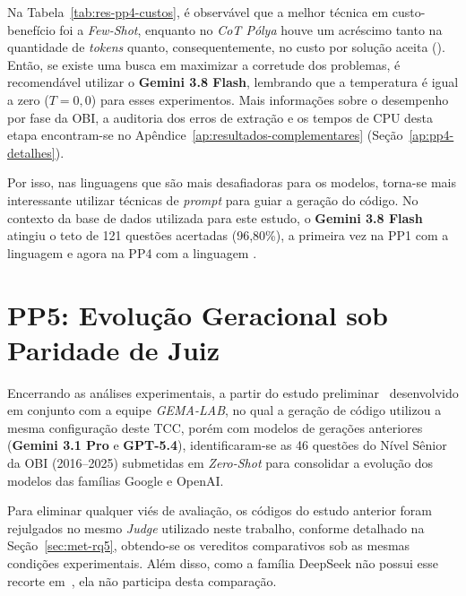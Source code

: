 Na Tabela~\ref{tab:res-pp4-custos}, é observável que a melhor técnica em custo-benefício foi a \textit{Few-Shot}, enquanto no \textit{CoT Pólya} houve um acréscimo tanto na quantidade de \textit{tokens} quanto, consequentemente, no custo por solução aceita (). Então, se existe uma busca em maximizar a corretude dos problemas, é recomendável utilizar o \textbf{Gemini 3.8 Flash}, lembrando que a temperatura é igual a zero ($T = 0{,}0$) para esses experimentos. Mais informações sobre o desempenho por fase da OBI, a auditoria dos erros de extração e os tempos de CPU desta etapa encontram-se no Apêndice~\ref{ap:resultados-complementares} (Seção~\ref{ap:pp4-detalhes}).

Por isso, nas linguagens que são mais desafiadoras para os modelos, torna-se mais interessante utilizar técnicas de \textit{prompt} para guiar a geração do código. No contexto da base de dados utilizada para este estudo, o \textbf{Gemini 3.8 Flash} atingiu o teto de 121 questões acertadas (96,80\%), a primeira vez na PP1 com a linguagem  e agora na PP4 com a linguagem .

\section{PP5: Evolução Geracional sob Paridade de Juiz}\label{sec:res-rq5}

Encerrando as análises experimentais, a partir do estudo preliminar~\citep{angelo2026ise} desenvolvido em conjunto com a equipe \textit{GEMA-LAB}, no qual a geração de código utilizou a mesma configuração deste TCC, porém com modelos de gerações anteriores (\textbf{Gemini 3.1 Pro} e \textbf{GPT-5.4}), identificaram-se as 46 questões do Nível Sênior da OBI (2016--2025) submetidas em  \textit{Zero-Shot} para consolidar a evolução dos modelos das famílias Google e OpenAI.

Para eliminar qualquer viés de avaliação, os códigos do estudo anterior foram rejulgados no mesmo \textit{Judge} utilizado neste trabalho, conforme detalhado na Seção~\ref{sec:met-rq5}, obtendo-se os vereditos comparativos sob as mesmas condições experimentais. Além disso, como a família DeepSeek não possui esse recorte em~\citet{angelo2026ise}, ela não participa desta comparação.

